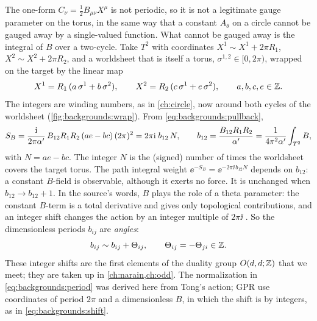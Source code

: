 The one-form $C_\nu=\tfrac12B_{\mu\nu}X^\mu$ is not periodic, so it is not a legitimate gauge
parameter on the torus, in the same way that a constant $A_\theta$ on a circle cannot be
gauged away by a single-valued function. What cannot be gauged away is the integral of $B$
over a two-cycle. Take $T^2$ with coordinates $X^1\sim X^1+2\pi R_1$,
$X^2\sim X^2+2\pi R_2$, and a worldsheet that is itself a torus, $\sigma^{1,2}\in[0,2\pi)$,
wrapped on the target by the linear map
\[
  X^1=R_1\,(a\,\sigma^1+b\,\sigma^2),\qquad X^2=R_2\,(c\,\sigma^1+e\,\sigma^2),
  \qquad a,b,c,e\in\mathbb{Z} .
\]
The integers are winding numbers, as in \cref{ch:circle}, now around both cycles of the
worldsheet (\cref{fig:backgrounds:wrap}). From \eqref{eq:backgrounds:pullback},
\begin{equation}\label{eq:backgrounds:period}
  S_B=\frac{\mathrm{i}}{2\pi\alpha'}\,B_{12}R_1R_2\,(ae-bc)\,(2\pi)^2
  =2\pi\mathrm{i}\;b_{12}\,N,\qquad
  b_{12}=\frac{B_{12}R_1R_2}{\alpha'}=\frac{1}{4\pi^2\alpha'}\int_{T^2}B,
\end{equation}
with $N=ae-bc$.
The integer $N$ is the (signed) number of times the worldsheet covers the target torus. The path
integral weight $\ee^{-S_B}=\ee^{-2\pi\ii\,b_{12}N}$ depends on $b_{12}$: a constant $B$-field
is observable, although it exerts no force. It is unchanged when $b_{12}\to b_{12}+1$. In the
source's words, $B$ plays the role of a theta parameter: the constant $B$-term is a total
derivative and gives only topological contributions, and an integer shift changes the action
by an integer multiple of $2\pi\ii$ . \TL{} So the
dimensionless periods $b_{ij}$ are \emph{angles}:
\begin{equation}\label{eq:backgrounds:shift}
  b_{ij}\sim b_{ij}+\Theta_{ij},\qquad\Theta_{ij}=-\Theta_{ji}\in\mathbb{Z} .
\end{equation}
These integer shifts are the first elements of the duality group $O(d,d;\mathbb{Z})$ that we meet; they
are taken up in \cref{ch:narain,ch:odd}. The normalization in \eqref{eq:backgrounds:period}
was derived here from Tong's action; GPR use coordinates of period $2\pi$ and a dimensionless
$B$, in which the shift is by integers, as in \eqref{eq:backgrounds:shift}.

